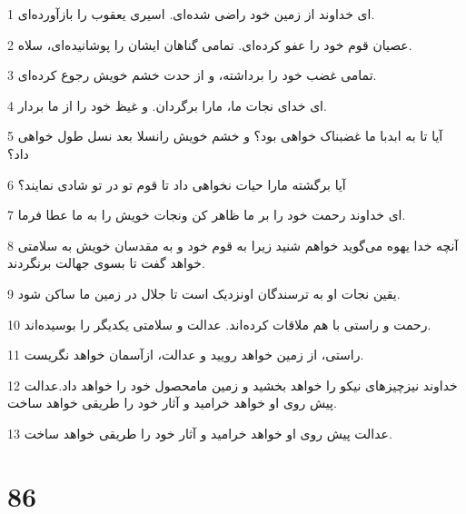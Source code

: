 \par 1 ای خداوند از زمین خود راضی شده‌ای. اسیری یعقوب را بازآورده‌ای.
\par 2 عصیان قوم خود را عفو کرده‌ای. تمامی گناهان ایشان را پوشانیده‌ای، سلاه.
\par 3 تمامی غضب خود را برداشته، و از حدت خشم خویش رجوع کرده‌ای.
\par 4 ‌ای خدای نجات ما، مارا برگردان. و غیظ خود را از ما بردار.
\par 5 آیا تا به ابدبا ما غضبناک خواهی بود؟ و خشم خویش رانسلا بعد نسل طول خواهی داد؟
\par 6 آیا برگشته مارا حیات نخواهی داد تا قوم تو در تو شادی نمایند؟
\par 7 ‌ای خداوند رحمت خود را بر ما ظاهر کن ونجات خویش را به ما عطا فرما.
\par 8 آنچه خدا یهوه می‌گوید خواهم شنید زیرا به قوم خود و به مقدسان خویش به سلامتی خواهد گفت تا بسوی جهالت برنگردند.
\par 9 یقین نجات او به ترسندگان اونزدیک است تا جلال در زمین ما ساکن شود.
\par 10 رحمت و راستی با هم ملاقات کرده‌اند. عدالت و سلامتی یکدیگر را بوسیده‌اند.
\par 11 راستی، از زمین خواهد رویید و عدالت، ازآسمان خواهد نگریست.
\par 12 خداوند نیزچیزهای نیکو را خواهد بخشید و زمین مامحصول خود را خواهد داد.عدالت پیش روی او خواهد خرامید و آثار خود را طریقی خواهد ساخت.
\par 13 عدالت پیش روی او خواهد خرامید و آثار خود را طریقی خواهد ساخت.
 
\chapter{86}

